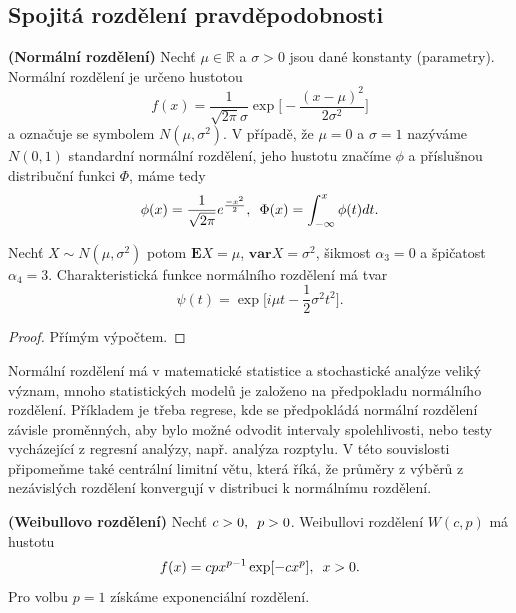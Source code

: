 \subsection{Spojitá rozdělení pravděpodobnosti}
\begin{definition}{\textbf{(Normální rozdělení)}}
Nechť $ \mu \in \mathbb{R}$ a $\sigma > 0$ jsou dané konstanty (parametry). Normální rozdělení je určeno hustotou
\begin{equation}
f(x) = \frac{1}{\sqrt{2\pi}\sigma}\exp \bigg[ -\frac{(x - \mu)^{2}}{2\sigma^{2}} \bigg]
\end{equation}
a označuje se symbolem $N(\mu, \sigma^{2}).$ V případě, že $\mu = 0$ a $\sigma = 1$ nazýváme $N(0, 1)$ standardní normální rozdělení, jeho hustotu značíme $\phi$ a příslušnou distribuční funkci $\Phi$, máme tedy
\begin{equation}
\phi(x) = \frac{1}{\sqrt{2\pi}}e^{\frac{-x^{2}}{2}}, \enskip \Phi(x) = \int_{-\infty}^{x}\phi(t)dt.
\end{equation}
\end{definition}

\begin{proposition}
Nechť $X \sim N(\mu, \sigma^{2})$ potom $\mathbf{E}X = \mu$, $\mathbf{var}X = \sigma^{2}$, šikmost $\alpha_{3} = 0$ a špičatost $\alpha_{4} = 3$. Charakteristická funkce normálního rozdělení má tvar 
\begin{equation}
\psi(t) = \exp\bigg[ i\mu t - \frac{1}{2}\sigma^{2}t^{2} \bigg].
\end{equation}
\end{proposition}
\begin{proof}
Přímým výpočtem.
\end{proof}

\begin{remark}
Normální rozdělení má v matematické statistice a stochastické analýze veliký význam, mnoho statistických modelů je založeno na předpokladu normálního rozdělení. Příkladem je třeba regrese, kde se předpokládá normální rozdělení závisle proměnných, aby bylo možné odvodit intervaly spolehlivosti, nebo testy vycházející z regresní analýzy, např. analýza rozptylu. V této souvislosti připomeňme také centrální limitní větu, která říká, že průměry z výběrů z nezávislých rozdělení konvergují v distribuci k normálnímu rozdělení.
\end{remark}

\begin{definition}{\textbf{(Weibullovo rozdělení)}}
Nechť $c > 0, \enskip p > 0$. Weibullovi rozdělení $W(c, p)$ má hustotu
\begin{equation}
f(x) = cpx^{p-1}\exp[-cx^{p}], \enskip x > 0.
\end{equation}
Pro volbu $p = 1$ získáme exponenciální rozdělení.
\end{definition}


